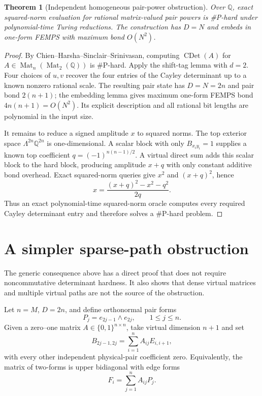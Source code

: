 \documentclass[11pt]{article}
\newtheorem{theorem}{Theorem}
\newcommand{\Mat}{\operatorname{Mat}}
\newcommand{\CayleyDet}{\operatorname{CDet}}
\begin{document}
\begin{theorem}[Independent homogeneous pair-power obstruction]
Over $\mathbb Q$, exact squared-norm evaluation for rational matrix-valued
pair powers is \#P-hard under polynomial-time Turing reductions.  The
construction has $D=N$ and embeds in one-form FEMPS with maximum bond
$O(N^2)$.
\end{theorem}

\begin{proof}
By Chien--Harsha--Sinclair--Srinivasan, computing
$\CayleyDet(A)$ for $A\in\Mat_n(\Mat_2(\mathbb Q))$ is \#P-hard. Apply the
shift-tag lemma with $d=2$. Four choices of $u,v$ recover the four entries of
the Cayley determinant up to a known nonzero rational scale. The resulting
pair state has $D=N=2n$ and pair bond $2(n+1)$; the embedding lemma gives
maximum one-form FEMPS bond $4n(n+1)=O(N^2)$. Its explicit description and
all rational bit lengths are polynomial in the input size.

It remains to reduce a signed amplitude $x$ to squared norms. The top exterior space
$\Lambda^{2n}\mathbb Q^{2n}$ is one-dimensional. A scalar block with only
$B_{x_i y_i}=1$ supplies a known top coefficient
$q=(-1)^{n(n-1)/2}$. A virtual direct sum adds this scalar block to the hard
block, producing amplitude $x+q$ with only constant additive bond overhead.
Exact squared-norm queries give $x^2$ and $(x+q)^2$, hence
\[
 x=\frac{(x+q)^2-x^2-q^2}{2q}.
\]
Thus an exact polynomial-time squared-norm oracle computes every required
Cayley determinant entry and therefore solves a \#P-hard problem.
\end{proof}

\section{A simpler sparse-path obstruction}

The generic consequence above has a direct proof that does not require
noncommutative determinant hardness. It also shows that dense virtual matrices
and multiple virtual paths are not the source of the obstruction.

Let $n=M$, $D=2n$, and define orthonormal pair forms
\[
 P_j=e_{2j-1}\wedge e_{2j},\qquad 1\le j\le n.
\]
Given a zero--one matrix $A\in\{0,1\}^{n\times n}$, take virtual dimension
$n+1$ and set
\[
 B_{2j-1,2j}=\sum_{i=1}^n A_{ij}E_{i,i+1},
\]
with every other independent physical-pair coefficient zero. Equivalently,
the matrix of two-forms is upper bidiagonal with edge forms
\[
 F_i=\sum_{j=1}^n A_{ij}P_j.
\]
\end{document}
